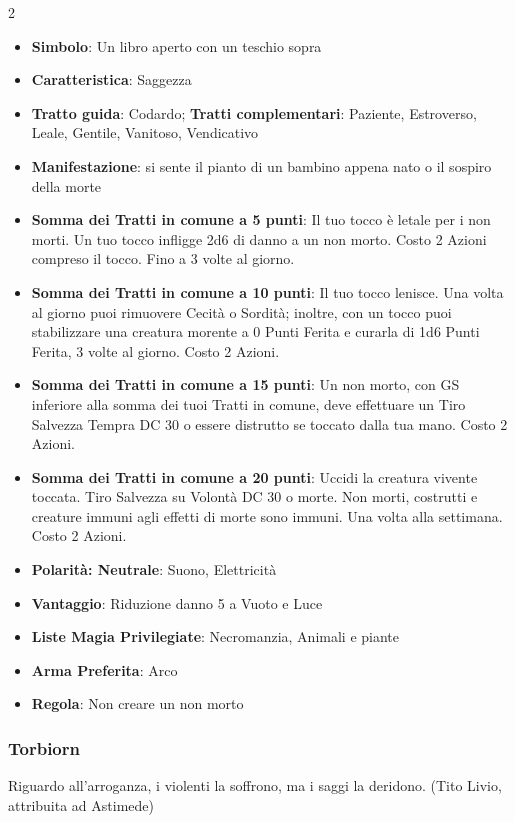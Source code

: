 \begin{multicols}{2}
\begin{itemize}[leftmargin=*] \setlength{\itemsep}{0pt}
\item \textbf{Simbolo}: Un libro aperto con un teschio sopra
\item \textbf{Caratteristica}: Saggezza
\item \textbf{Tratto guida}: Codardo; \textbf{Tratti complementari}: Paziente, Estroverso, Leale, Gentile, Vanitoso, Vendicativo
\item \textbf{Manifestazione}: si sente il pianto di un bambino appena nato o il sospiro della morte
\item \textbf{Somma dei Tratti in comune a 5 punti}: Il tuo tocco è letale per i non morti. Un tuo tocco infligge 2d6 di danno a un non morto. Costo 2 Azioni compreso il tocco. Fino a 3 volte al giorno.
\item \textbf{Somma dei Tratti in comune a 10 punti}: Il tuo tocco lenisce. Una volta al giorno puoi rimuovere Cecità o Sordità; inoltre, con un tocco puoi stabilizzare una creatura morente a 0 Punti Ferita e curarla di 1d6 Punti Ferita, 3 volte al giorno. Costo 2 Azioni.
\item \textbf{Somma dei Tratti in comune a 15 punti}: Un non morto, con GS inferiore alla somma dei tuoi Tratti in comune, deve effettuare un Tiro Salvezza Tempra DC 30 o essere distrutto se toccato dalla tua mano. Costo 2 Azioni.
\item \textbf{Somma dei Tratti in comune a 20 punti}: Uccidi la creatura vivente toccata. Tiro Salvezza su Volontà DC 30 o morte. Non morti, costrutti e creature immuni agli effetti di morte sono immuni. Una volta alla settimana. Costo 2 Azioni.
\item \textbf{Polarità: Neutrale}: Suono, Elettricità
\item \textbf{Vantaggio}: Riduzione danno 5 a Vuoto e Luce
\item \textbf{Liste Magia Privilegiate}: Necromanzia, Animali e piante
\item \textbf{Arma Preferita}: Arco
\item \textbf{Regola}: Non creare un non morto
\end{itemize}

\subsubsection{Torbiorn}\label{torbiorn}\hypertarget{torbiorn}{}

\begin{enfasi}{
Riguardo all'arroganza, i violenti la soffrono, ma i saggi la deridono. (Tito Livio, attribuita ad Astimede)
}\end{enfasi}


\end{multicols}
